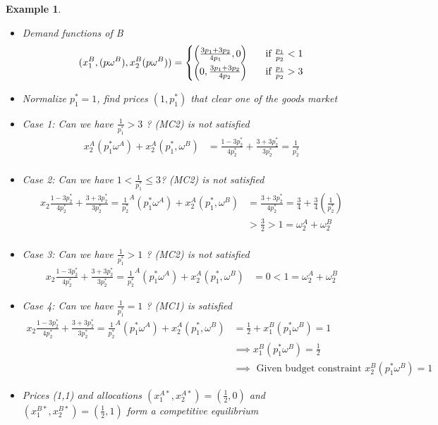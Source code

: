 \documentclass[twoside]{article}
\newtheorem{ex}[theorem]{Example}
\begin{document}
\begin{ex}
\begin{itemize}
\item Demand functions of B
\[(x_1^B, (p\omega^B), x_2^B(p\omega^B)) = 
\begin{cases}
\left(\frac{3p_1 + 3p_2}{4p_1},0 \right)& \hspace{0.2cm} \text{ if } \frac{p_1}{p_2} < 1 \\
\left(0, \frac{3p_1 + 3p_2}{4p_2}\right) & \hspace{0.2cm} \text{ if } \frac{p_1}{p_2} > 3
\end{cases} \]
\item Normalize \(p_1^* = 1\), find prices \((1, p_1^*)\) that clear one of the goods market 
\item Case 1:  Can we have \(\frac{1}{p_1^*} > 3\) ? (MC2) is not satisfied
\[\begin{aligned} x_2^A (p_1^* \omega^A) + x_2^A(p_1^*, \omega^B) & = \frac{1-3p_2^*}{4p_2^*} + \frac{3+3p_2^*}{3p_2^*}  = \frac{1}{p_2^*} \\
\end{aligned}\]
\item Case 2:  Can we have \(1 < \frac{1}{p_1^*} \leq 3\)? (MC2) is not satisfied
\[\begin{aligned} x_2\frac{1-3p_2^*}{4p_2^*} + \frac{3+3p_2^*}{3p_2^*}  = \frac{1}{p_2^*} ^A (p_1^* \omega^A) + x_2^A(p_1^*, \omega^B) & = \frac{3 + 3p_2^*}{4p_2^*}  = \frac{3}{4} + \frac{3}{4} (\frac{1}{p_2^*}) \\
& > \frac{3}{2} > 1 = \omega_2^A + \omega^B_2 \\
\end{aligned}\]
\item Case 3: Can we have \(\frac{1}{p_1^*} > 1\) ? (MC2) is not satisfied
\[\begin{aligned} x_2\frac{1-3p_2^*}{4p_2^*} + \frac{3+3p_2^*}{3p_2^*}  = \frac{1}{p_2^*} ^A (p_1^* \omega^A) + x_2^A(p_1^*, \omega^B) & = 0 < 1 = \omega^A_2 + \omega_2^B  
\end{aligned}\]
\item Case 4: Can we have \(\frac{1}{p_1^*} = 1\) ? (MC1) is satisfied
\[\begin{aligned} x_2\frac{1-3p_2^*}{4p_2^*} + \frac{3+3p_2^*}{3p_2^*}  = \frac{1}{p_2^*} ^A (p_1^* \omega^A) + x_2^A(p_1^*, \omega^B) & = \frac{1}{2} + x_1^B(p_1^* \omega^B) = 1\\
& \implies x_1^B (p^*_1 \omega^B) = \frac{1}{2}\\
& \implies \text{ Given budget constraint } x_2^B(p_1^* \omega^B) = 1
\end{aligned}\]
\item Prices (1,1) and allocations \((x_1^{A*}, x_2^{A*}) = \left(\frac{1}{2},0\right)\) and \((x_1^{B*}, x_2^{B*}) = \left(\frac{1}{2}, 1 \right)\) form a competitive equilibrium
\end{itemize}
\end{ex}
\end{document}
